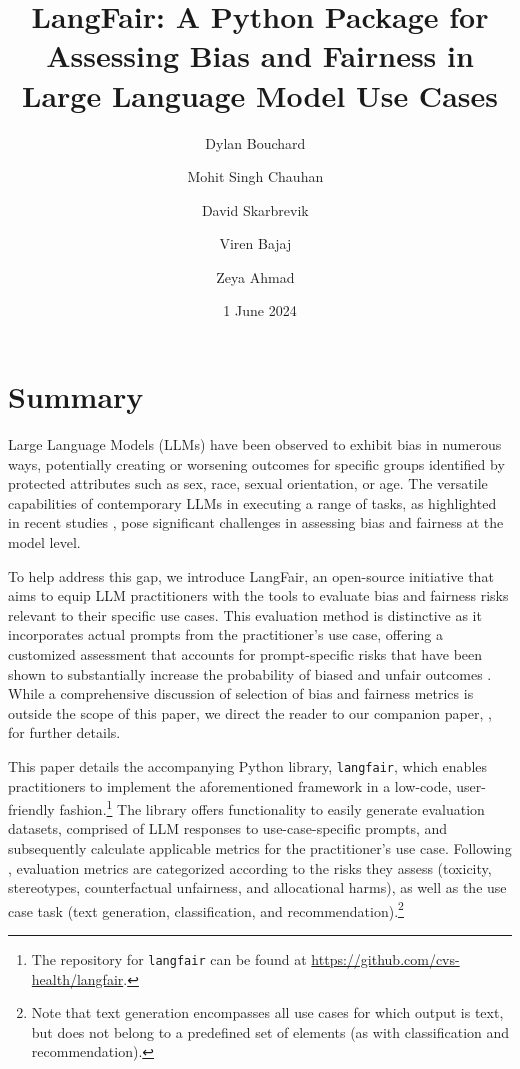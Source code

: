 \documentclass[
]{article}
\title{LangFair: A Python Package for Assessing Bias and Fairness in Large Language Model Use Cases}
\author[1]{Dylan Bouchard%
    \,\orcidlink{0009-0004-9233-2324}\,%
    }
\author[1]{Mohit Singh Chauhan%
    \,\orcidlink{0000-0002-7817-0427}\,%
    }
\author[1]{David Skarbrevik%
    \,\orcidlink{0009-0005-0005-0408}\,%
    }
\author[1]{Viren Bajaj%
    \,\orcidlink{0000-0002-9984-1293}\,%
    }
\author[1]{Zeya Ahmad%
    \,\orcidlink{0009-0009-1478-2940}\,%
    }
\affil[1]{CVS Health\textsuperscript{\textregistered} Corporation}
\date{1 June 2024}
\begin{document}
\maketitle


\section{Summary}

Large Language Models (LLMs) have been observed to exhibit bias in numerous ways, potentially creating or worsening outcomes for specific groups identified by protected attributes such as sex, race, sexual orientation, or age. The versatile capabilities of contemporary LLMs in executing a range of tasks, as highlighted in recent studies \cite{minaee2024large, chatgpt_survey, generalsurvey}, pose significant challenges in assessing bias and fairness at the model level.

To help address this gap, we introduce LangFair, an open-source initiative that aims to equip LLM practitioners with the tools to evaluate bias and fairness risks relevant to their specific use cases. This evaluation method is distinctive as it incorporates actual prompts from the practitioner's use case, offering a customized assessment that accounts for prompt-specific risks that have been shown to substantially increase the probability of biased and unfair outcomes \cite{wang2023decodingtrust}. While a comprehensive discussion of selection of bias and fairness metrics is outside the scope of this paper, we direct the reader to our companion paper, \cite{bouchard2024actionableframeworkassessingbias}, for further details.

This paper details the accompanying Python library, \texttt{langfair}, which enables practitioners to implement the aforementioned framework in a low-code, user-friendly fashion.\footnote{The repository for \texttt{langfair} can be found at \url{https://github.com/cvs-health/langfair}.} The library offers functionality to easily generate evaluation datasets, comprised of LLM responses to use-case-specific prompts, and subsequently calculate applicable metrics for the practitioner's use case. Following \cite{bouchard2024actionableframeworkassessingbias}, evaluation metrics are categorized according to the risks they assess (toxicity, stereotypes, counterfactual unfairness, and allocational harms), as well as the use case task (text generation, classification, and recommendation).\footnote{Note that text generation encompasses all use cases for which output is text, but does not belong to a predefined set of elements (as with classification and recommendation).}
\end{document}

